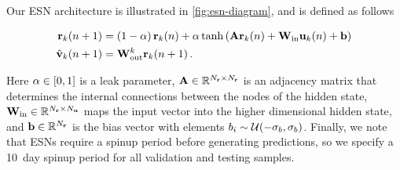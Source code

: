Our ESN architecture is illustrated in \cref{fig:esn-diagram}, and is defined as
follows
\begin{linenomath*}\begin{equation}
    \begin{aligned}
        \mathbf{r}_{k}(n+1)
        &=
        \left(1-\alpha\right)\mathbf{r}_{k}(n)
        +
        \alpha \tanh\left(
            \mathbf{A} \mathbf{r}_{k}(n) + \mathbf{W}_\text{in} \mathbf{u}_{k}(n) + \mathbf{b}
            \right)
             \\
        \hat{\mathbf{v}}_{k}(n+1)
        &= \mathbf{W}_\text{out}^{k} \mathbf{r}_{k}(n+1) \, .
    \end{aligned}
    \label{eq:rc}
\end{equation}\end{linenomath*}
Here
$\alpha\in[0,1]$ is a leak parameter,
$\mathbf{A} \in \mathbb{R}^{N_{\mathbf{r}}\times N_{\mathbf{r}}}$ is an adjacency matrix that
determines the internal connections between the nodes of the hidden state,
$\mathbf{W}_\text{in} \in \mathbb{R}^{N_{\mathbf{r}}\times N_{\mathbf{u}}}$ maps the input vector
into the higher dimensional hidden state,
and $\mathbf{b}\in\mathbb{R}^{N_{\mathbf{r}}}$
is the bias vector with elements
$b_i \sim \mathcal{U}(-\sigma_{b},\sigma_{b})$.
Finally, we note that ESNs require a spinup period before generating
predictions, so we specify a 10~day spinup period for all validation and testing
samples.

